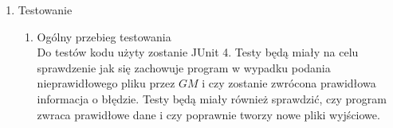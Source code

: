 \documentclass[11pt]{article}
\begin{document}
\begin{enumerate}
\begin{enumerate}[label=\arabic{enumi}.\arabic*.]
\end{enumerate}


 \item Testowanie\\
 \begin{enumerate}
 \item Ogólny przebieg testowania\\
 Do testów kodu użyty zostanie JUnit 4. Testy będą miały na celu sprawdzenie jak się zachowuje program w wypadku podania nieprawidłowego pliku przez $GM$ i czy zostanie zwrócona prawidłowa informacja o błędzie. Testy będą miały również sprawdzić, czy program zwraca prawidłowe dane i czy poprawnie tworzy nowe pliki wyjściowe.
 \end{enumerate}


\end{enumerate}
\end{document}
